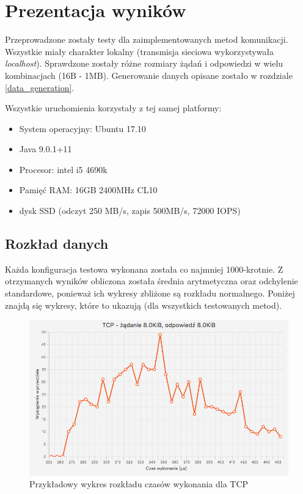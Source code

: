 \chapter{Prezentacja wyników}

Przeprowadzone zostały testy dla zaimplementowanych metod komunikacji. Wszystkie miały charakter lokalny (transmisja sieciowa wykorzystywała \textit{localhost}). Sprawdzone zostały różne rozmiary żądań i odpowiedzi w wielu kombinacjach (16B - 1MB). Generowanie danych opisane zostało w rozdziale \ref{data_generation}.

Wszystkie uruchomienia korzystały z tej samej platformy:
\begin{itemize}
    \item System operacyjny: Ubuntu 17.10
    \item Java 9.0.1+11
    \item Procesor: intel i5 4690k
    \item Pamięć RAM: 16GB 2400MHz CL10
    \item dysk SSD (odczyt 250 MB/s, zapis 500MB/s, 72000 IOPS)
\end{itemize}


\section{Rozkład danych}

Każda konfiguracja testowa wykonana została co najmniej 1000-krotnie. Z otrzymanych wyników obliczona została średnia arytmetyczna oraz odchylenie standardowe, ponieważ ich wykresy zbliżone są rozkładu normalnego. Poniżej znajdą się wykresy, które to ukazują (dla wszystkich testowanych metod).


\begin{figure}[H]
    \centering
    \includegraphics[scale=0.38]{img/charts/TCP_chart_8192_8192.png}
    \caption{Przykładowy wykres rozkładu czasów wykonania dla TCP}
\end{figure}

